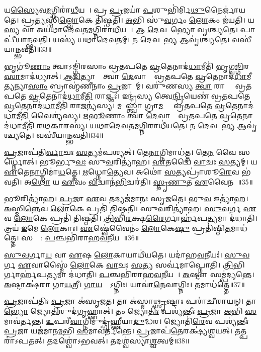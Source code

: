 𑌯\ul{𑌸𑍍𑌯𑍈}𑌵\ul{𑌮}𑌗𑍍𑌨𑌿𑌰𑌾॑\ul{𑌧𑍀}𑌯𑌤𑍇᳚।
𑌪𑍍𑌰 \ul{𑌪𑍍𑌰}𑌜𑌯𑌾॑ \ul{𑌪}𑌶𑍁𑌭𑌿॑𑌰𑍍𑌮𑌿\ul{𑌥𑍁}𑌨𑍈𑌰𑍍𑌜𑌾॑𑌯𑌤𑍇।
𑌪𑍍𑌰\ul{𑌤𑍍𑌯}𑌸𑍍𑌮𑌿𑌁\ul{𑌲𑍍𑌲𑍋}𑌕𑍇 𑌤𑌿॑𑌷𑍍𑌠𑌤𑌿।
\ul{𑌅}𑌭𑌿 𑌸𑍁॑\ul{𑌵}𑌰𑍍𑌗𑌂 \ul{𑌲𑍋}𑌕𑌂 𑌜॑𑌯𑌤𑌿।
𑌯\ul{𑌸𑍍𑌯} 𑌵𑌾 𑌅𑌯॑𑌥𑌾𑌦𑍇𑌵𑌤\ul{𑌮}𑌗𑍍𑌨𑌿𑌰𑌾॑\ul{𑌧𑍀}𑌯𑌤𑍇᳚।
𑌆 \ul{𑌦𑍇}𑌵𑌤𑌾᳚𑌭𑍍𑌯𑍋 𑌵𑍃𑌶𑍍𑌚𑍍𑌯𑌤𑍇।
𑌪𑌾𑌪𑍀॑𑌯𑌾𑌨𑍍𑌭𑌵𑌤𑌿।
𑌯𑌸𑍍𑌯॑ 𑌯𑌥𑌾𑌦𑍇\ul{𑌵}𑌤𑌮𑍍।
𑌨 \ul{𑌦𑍇}𑌵𑌤𑌾᳚\ul{𑌭𑍍𑌯} 𑌆𑌵𑍃॑𑌶𑍍𑌚𑍍𑌯𑌤𑍇।
𑌵𑌸𑍀॑𑌯𑌾𑌨𑍍𑌭𑌵𑌤𑌿॥33॥

𑌭𑍃𑌗𑍂॑\ul{𑌣𑌾𑌂} 𑌤𑍍𑌵𑌾\-𑌽𑌙𑍍𑌗𑌿॑𑌰𑌸𑌾𑌂 𑌵𑍍𑌰𑌤𑌪𑌤𑍇 \ul{𑌵𑍍𑌰}𑌤𑍇𑌨𑌾𑌦॑\ul{𑌧𑌾}𑌮𑍀𑌤𑌿॑ 𑌭𑍃𑌗𑍍𑌵\ul{𑌙𑍍𑌗𑌿}𑌰\ul{𑌸𑌾}\-𑌮𑌾𑌦॑𑌧𑍍𑌯𑌾𑌤𑍍।
\ul{𑌆}\ul{𑌦𑌿}𑌤𑍍𑌯𑌾𑌨𑌾𑌂᳚ 𑌤𑍍𑌵𑌾 \ul{𑌦𑍇}𑌵𑌾𑌨𑌾𑌂᳚ 𑌵𑍍𑌰𑌤𑌪𑌤𑍇 \ul{𑌵𑍍𑌰}𑌤𑍇𑌨𑌾𑌦॑\ul{𑌧𑌾}𑌮𑍀\-\ul{𑌤𑍍𑌯}𑌨𑍍𑌯𑌾\ul{𑌸𑌾𑌂} 𑌬𑍍𑌰𑌾𑌹𑍍𑌮॑𑌣𑍀𑌨𑌾𑌂 \ul{𑌪𑍍𑌰}𑌜𑌾𑌨𑌾᳚𑌮𑍍।
𑌵𑌰𑍁॑𑌣𑌸𑍍𑌯 \ul{𑌤𑍍𑌵𑌾} 𑌰𑌾𑌜𑍍𑌞𑍋᳚ 𑌵𑍍𑌰𑌤𑌪𑌤𑍇 \ul{𑌵𑍍𑌰}𑌤𑍇𑌨𑌾𑌦॑\ul{𑌧𑌾}𑌮𑍀\ul{𑌤𑌿} 𑌰𑌾𑌜𑍍𑌞𑌃॑।
𑌇𑌨𑍍𑌦𑍍𑌰॑𑌸𑍍𑌯 𑌤𑍍𑌵𑍇\ul{𑌨𑍍𑌦𑍍𑌰𑌿}𑌯𑍇𑌣॑ 𑌵𑍍𑌰𑌤𑌪𑌤𑍇 \ul{𑌵𑍍𑌰}𑌤𑍇𑌨𑌾𑌦॑\ul{𑌧𑌾}𑌮𑍀𑌤𑌿॑ 𑌰𑌾\ul{𑌜}𑌨𑍍𑌯॑𑌸𑍍𑌯।
𑌮𑌨𑍋᳚𑌸𑍍𑌤𑍍𑌵𑌾 𑌗𑍍𑌰𑌾\ul{𑌮}𑌣𑍍𑌯𑍋᳚ 𑌵𑍍𑌰𑌤𑌪𑌤𑍇 \ul{𑌵𑍍𑌰}𑌤𑍇𑌨𑌾𑌦॑\ul{𑌧𑌾}𑌮𑍀\ul{𑌤𑌿} 𑌵𑍈𑌶𑍍𑌯॑𑌸𑍍𑌯।
\ul{𑌋}\ul{𑌭𑍂}𑌣𑌾𑌂 𑌤𑍍𑌵𑌾॑ \ul{𑌦𑍇}𑌵𑌾𑌨𑌾𑌂᳚ 𑌵𑍍𑌰𑌤𑌪𑌤𑍇 \ul{𑌵𑍍𑌰}𑌤𑍇𑌨𑌾𑌦॑\ul{𑌧𑌾}𑌮𑍀𑌤𑌿॑ 𑌰𑌥\ul{𑌕𑌾}𑌰𑌸𑍍𑌯॑।
\ul{𑌯}\ul{𑌥𑌾}\ul{𑌦𑍇}\ul{𑌵}𑌤\ul{𑌮}𑌗𑍍𑌨𑌿𑌰𑌾𑌧𑍀॑𑌯𑌤𑍇।
𑌨 \ul{𑌦𑍇}𑌵𑌤𑌾᳚\ul{𑌭𑍍𑌯} 𑌆𑌵𑍃॑𑌶𑍍𑌚𑍍𑌯𑌤𑍇।
𑌵𑌸𑍀॑𑌯𑌾𑌨𑍍𑌭𑌵𑌤𑌿॥34॥\anuvakamend[\ul{𑌧𑍍𑌯𑌾}\ul{𑌯}\ul{𑌤𑌿} 𑌵𑍈 𑌰𑌾\ul{𑌤𑍍𑌰𑌿}𑌶𑍍𑌚𑌾𑌵॑𑌰𑍁𑌨𑍍𑌧𑍇 𑌭𑌵𑌿\ul{𑌷𑍍𑌯}𑌨𑍍𑌤𑍀𑌤𑍍𑌯॑𑌬𑍍𑌰𑌵𑍀𑌜𑍍𑌜\ul{𑌨𑌿}𑌷𑍍𑌯𑌸𑍇॑\-𑌽𑌜\ul{𑌯}𑌦𑍍𑌵𑌸𑍀॑𑌯𑌾𑌨𑍍𑌭𑌵\ul{𑌤𑌿} 𑌨𑌵॑ 𑌚]

\ul{𑌪𑍍𑌰}𑌜𑌾𑌪॑𑌤𑌿\ul{𑌰𑍍𑌵𑌾}𑌚𑌃 \ul{𑌸}𑌤𑍍𑌯𑌮॑𑌪𑌶𑍍𑌯𑌤𑍍।
𑌤𑍇\ul{𑌨𑌾}𑌗𑍍𑌨𑌿𑌮𑌾𑌧॑𑌤𑍍𑌤।
𑌤𑍇\ul{𑌨} 𑌵𑍈 𑌸 𑌆᳚𑌰𑍍𑌧𑍍𑌨𑍋𑌤𑍍।
𑌭𑍂𑌰𑍍𑌭𑍁\ul{𑌵𑌃} 𑌸𑍁\ul{𑌵}𑌰𑌿𑌤𑍍𑌯𑌾॑𑌹।
\ul{𑌏}𑌤𑌦𑍍𑌵𑍈 \ul{𑌵𑌾}𑌚𑌃 \ul{𑌸}𑌤𑍍𑌯𑌮𑍍।
𑌯 \ul{𑌏}𑌤𑍇\ul{𑌨𑌾}𑌗𑍍𑌨𑌿𑌮𑌾॑\ul{𑌧}𑌤𑍍𑌤𑍇।
\ul{𑌋}𑌧𑍍𑌨𑍋\ul{𑌤𑍍𑌯𑍇}𑌵।
𑌅𑌥𑍋॑ \ul{𑌸}𑌤𑍍𑌯𑌪𑍍𑌰𑌾॑𑌶𑍂\ul{𑌰𑍇}𑌵 𑌭॑𑌵𑌤𑌿।
𑌅\ul{𑌥𑍋} 𑌯 \ul{𑌏}𑌵𑌂 \ul{𑌵𑌿}𑌦𑍍𑌵𑌾𑌨॑\ul{𑌭𑌿}𑌚𑌰॑𑌤𑌿।
\ul{𑌸𑍍𑌤𑍃}\ul{𑌣𑍁}𑌤 \ul{𑌏}𑌵𑍈𑌨𑌮𑍍᳚॥35॥

𑌭𑍂𑌰𑌿𑌤𑍍𑌯𑌾॑𑌹।
\ul{𑌪𑍍𑌰}𑌜𑌾 \ul{𑌏}𑌵 𑌤𑌦𑍍𑌯𑌜॑𑌮𑌾𑌨𑌃 𑌸𑍃𑌜𑌤𑍇।
𑌭𑍁\ul{𑌵} 𑌇𑌤𑍍𑌯𑌾॑𑌹।
\ul{𑌅}𑌸𑍍𑌮𑌿\ul{𑌨𑍍𑌨𑍇}𑌵 \ul{𑌲𑍋}𑌕𑍇 𑌪𑍍𑌰𑌤𑌿॑ 𑌤𑌿𑌷𑍍𑌠𑌤𑌿।
𑌸𑍁\ul{𑌵}𑌰𑌿𑌤𑍍𑌯𑌾॑𑌹।
\ul{𑌸𑍁}\ul{𑌵}𑌰𑍍𑌗 \ul{𑌏}𑌵 \ul{𑌲𑍋}𑌕𑍇 𑌪𑍍𑌰𑌤𑌿॑ 𑌤𑌿𑌷𑍍𑌠𑌤𑌿।
\ul{𑌤𑍍𑌰𑌿}𑌭𑌿\ul{𑌰}𑌕𑍍𑌷\ul{𑌰𑍈}𑌰𑍍𑌗𑌾𑌰𑍍\mbox{}𑌹॑𑌪\ul{𑌤𑍍𑌯}𑌮𑌾 𑌦॑𑌧𑌾𑌤𑌿।
𑌤𑍍𑌰𑌯॑ \ul{𑌇}𑌮𑍇 \ul{𑌲𑍋}𑌕𑌾𑌃।
\ul{𑌏}𑌷𑍍𑌵𑍇॑𑌵𑍈𑌨𑌂॑ \ul{𑌲𑍋}𑌕𑍇\ul{𑌷𑍁} 𑌪𑍍𑌰𑌤𑌿॑\-𑌷𑍍𑌠𑌿\ul{𑌤}𑌮𑌾𑌧॑𑌤𑍍𑌤𑍇।
𑌸𑌰𑍍𑌵𑍈᳚: \ul{𑌪}𑌞𑍍𑌚𑌭𑌿॑𑌰𑌾𑌹\ul{𑌵}𑌨𑍀𑌯𑌮𑍍᳚॥36॥

\ul{𑌸𑍁}\ul{𑌵}𑌰𑍍𑌗𑌾\ul{𑌯} 𑌵𑌾 \ul{𑌏}𑌷 \ul{𑌲𑍋}𑌕𑌾𑌯𑌾𑌧𑍀॑𑌯𑌤𑍇।
𑌯𑌦𑌾॑𑌹\ul{𑌵}𑌨𑍀𑌯𑌃॑।
\ul{𑌸𑍁}\ul{𑌵}𑌰𑍍𑌗 \ul{𑌏}𑌵𑌾𑌸𑍍𑌮𑍈॑ \ul{𑌲𑍋}𑌕𑍇 \ul{𑌵𑌾}𑌚𑌃 \ul{𑌸}𑌤𑍍𑌯 𑌸𑌰𑍍𑌵॑𑌮𑌾𑌪𑍍𑌨𑍋𑌤𑌿।
\ul{𑌤𑍍𑌰𑌿}𑌭𑌿𑌰𑍍𑌗𑌾𑌰𑍍\mbox{}𑌹॑𑌪\ul{𑌤𑍍𑌯}𑌮𑌾 𑌦॑𑌧𑌾𑌤𑌿।
\ul{𑌪}𑌞𑍍𑌚𑌭𑌿॑𑌰𑌾𑌹\ul{𑌵}𑌨𑍀𑌯𑌮𑍍᳚।
\ul{𑌅}𑌷𑍍𑌟𑍗 𑌸𑌮𑍍𑌪॑𑌦𑍍𑌯𑌨𑍍𑌤𑍇।
\ul{𑌅}𑌷𑍍𑌟𑌾𑌕𑍍𑌷॑𑌰𑌾 𑌗𑌾\ul{𑌯}𑌤𑍍𑌰𑍀।
\ul{𑌗𑌾}\ul{𑌯}𑌤𑍍𑌰𑍋᳚\-𑌽𑌗𑍍𑌨𑌿𑌃।
𑌯𑌾𑌵𑌾॑\ul{𑌨𑍇}𑌵𑌾𑌗𑍍𑌨𑌿𑌃।
𑌤𑌮𑌾𑌧॑𑌤𑍍𑌤𑍇॥37॥

\ul{𑌪𑍍𑌰}𑌜𑌾𑌪॑𑌤𑌿𑌃 \ul{𑌪𑍍𑌰}𑌜𑌾 𑌅॑𑌸𑍃𑌜𑌤।
𑌤𑌾 𑌅॑𑌸𑍍𑌮𑌾\ul{𑌥𑍍𑌸𑍃}𑌷𑍍𑌟𑌾𑌃 𑌪𑌰𑌾॑𑌚𑍀𑌰𑌾𑌯𑌨𑍍।
𑌤𑌾\ul{𑌭𑍍𑌯𑍋} 𑌜𑍍𑌯𑍋\ul{𑌤𑌿}𑌰𑍁𑌦॑𑌗𑍃𑌹𑍍𑌣𑌾𑌤𑍍।
𑌤𑌂 𑌜𑍍𑌯𑍋\ul{𑌤𑌿𑌃} 𑌪𑌶𑍍𑌯॑𑌨𑍍𑌤𑍀𑌃 \ul{𑌪𑍍𑌰}𑌜𑌾 \ul{𑌅}𑌭𑌿 \ul{𑌸}𑌮𑌾𑌵॑𑌰𑍍𑌤𑌨𑍍𑌤।
\ul{𑌉}𑌪𑌰𑍀॑\ul{𑌵𑌾}𑌗𑍍𑌨𑌿𑌮𑍁𑌦𑍍𑌗𑍃॑𑌹𑍍𑌣𑍀𑌯𑌾\ul{𑌦𑍁}𑌦𑍍𑌧𑌰\sn{}।
𑌜𑍍𑌯𑍋𑌤𑌿॑\ul{𑌰𑍇}𑌵 𑌪𑌶𑍍𑌯॑𑌨𑍍𑌤𑍀𑌃 \ul{𑌪𑍍𑌰}𑌜𑌾 𑌯𑌜॑𑌮𑌾𑌨\ul{𑌮}𑌭𑌿 \ul{𑌸}𑌮𑌾𑌵॑𑌰𑍍𑌤𑌨𑍍𑌤𑍇।
\ul{𑌪𑍍𑌰}𑌜𑌾𑌪॑\ul{𑌤𑍇}𑌰𑌕𑍍𑌷𑍍𑌯॑𑌶𑍍𑌵𑌯𑌤𑍍।
𑌤𑌤𑍍𑌪𑌰𑌾॑\-𑌽𑌪𑌤𑌤𑍍।
𑌤𑌦𑌶𑍍𑌵𑍋॑\-𑌽𑌭𑌵𑌤𑍍।
𑌤𑌦𑌶𑍍𑌵॑𑌸𑍍𑌯𑌾\ul{𑌶𑍍𑌵}𑌤𑍍𑌵𑌮𑍍॥38॥

